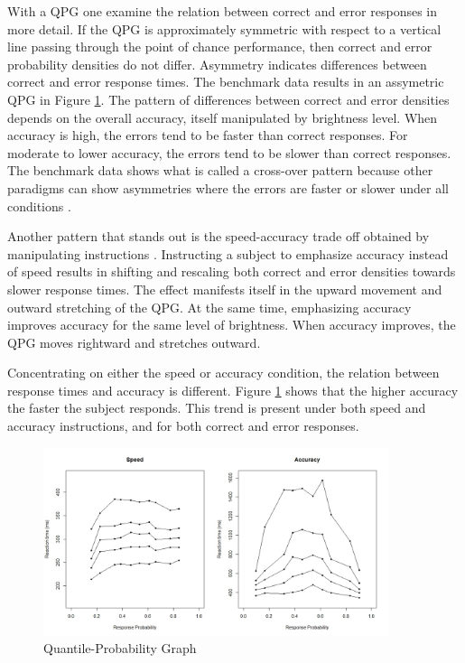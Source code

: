 \documentclass[12pt]{article}
\begin{document}
With a QPG one examine the relation between correct and error responses in more detail. If the QPG is approximately symmetric with respect to a vertical line passing through the point of chance performance, then correct and error probability densities do not differ. Asymmetry indicates differences between correct and error response times. The benchmark data results in an assymetric QPG in Figure \ref{fig:qp}. 
The pattern of differences between correct and error densities depends on the overall accuracy, itself manipulated by brightness level. When accuracy is high, the errors tend to be faster than correct responses. For moderate to lower accuracy, the errors tend to be slower than correct responses. The benchmark data shows what is called a cross-over pattern because other paradigms can show asymmetries where the errors are faster or slower under all conditions
\citep{RatTue2002,RatMck2008,Wag2009}.

Another pattern that stands out is the speed-accuracy trade off obtained by manipulating instructions \citep{Hei2014}. Instructing a subject to emphasize accuracy instead of speed results in shifting and rescaling both correct and error densities towards slower response times. The effect manifests itself in the upward movement and outward stretching of the QPG. At the same time, emphasizing accuracy improves accuracy for the same level of brightness. When accuracy improves, the QPG moves rightward and stretches outward.

Concentrating on either the speed or accuracy condition, the relation between response times and accuracy is different. Figure \ref{fig:qp} shows that the higher accuracy the faster the subject responds. This trend is present under both speed and accuracy instructions, and for both correct and error responses.

\begin{figure}
\centering
\includegraphics[width=0.9\textwidth]{QP_RRdata}
\caption{Quantile-Probability Graph}
\label{fig:qp}
\end{figure}
%
\end{document}
